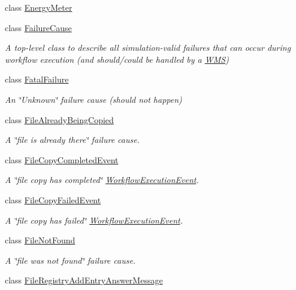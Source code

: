 \begin{DoxyCompactItemize}
class \hyperlink{classwrench_1_1_energy_meter}{Energy\+Meter}
\item 
class \hyperlink{classwrench_1_1_failure_cause}{Failure\+Cause}
\begin{DoxyCompactList}\small\item\em A top-\/level class to describe all simulation-\/valid failures that can occur during workflow execution (and should/could be handled by a \hyperlink{classwrench_1_1_w_m_s}{W\+MS}) \end{DoxyCompactList}\item 
class \hyperlink{classwrench_1_1_fatal_failure}{Fatal\+Failure}
\begin{DoxyCompactList}\small\item\em An \char`\"{}\+Unknown\char`\"{} failure cause (should not happen) \end{DoxyCompactList}\item 
class \hyperlink{classwrench_1_1_file_already_being_copied}{File\+Already\+Being\+Copied}
\begin{DoxyCompactList}\small\item\em A \char`\"{}file is already there\char`\"{} failure cause. \end{DoxyCompactList}\item 
class \hyperlink{classwrench_1_1_file_copy_completed_event}{File\+Copy\+Completed\+Event}
\begin{DoxyCompactList}\small\item\em A \char`\"{}file copy has completed\char`\"{} \hyperlink{classwrench_1_1_workflow_execution_event}{Workflow\+Execution\+Event}. \end{DoxyCompactList}\item 
class \hyperlink{classwrench_1_1_file_copy_failed_event}{File\+Copy\+Failed\+Event}
\begin{DoxyCompactList}\small\item\em A \char`\"{}file copy has failed\char`\"{} \hyperlink{classwrench_1_1_workflow_execution_event}{Workflow\+Execution\+Event}. \end{DoxyCompactList}\item 
class \hyperlink{classwrench_1_1_file_not_found}{File\+Not\+Found}
\begin{DoxyCompactList}\small\item\em A \char`\"{}file was not found\char`\"{} failure cause. \end{DoxyCompactList}\item 
class \hyperlink{classwrench_1_1_file_registry_add_entry_answer_message}{File\+Registry\+Add\+Entry\+Answer\+Message}

\end{DoxyCompactItemize}
